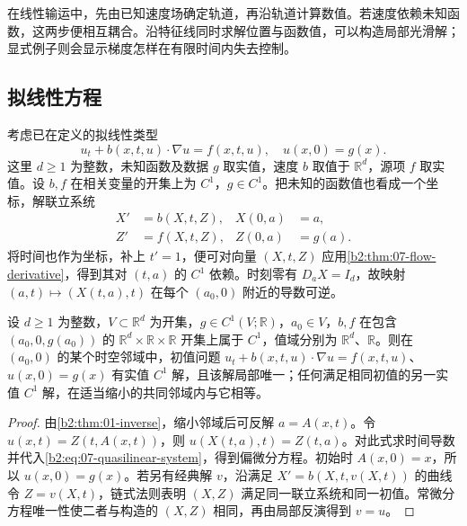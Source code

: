 
在线性输运中，先由已知速度场确定轨道，再沿轨道计算数值。若速度依赖未知函数，这两步便相互耦合。沿特征线同时求解位置与函数值，可以构造局部光滑解；显式例子则会显示梯度怎样在有限时间内失去控制。

\subsection{拟线性方程}
\label{b2:subsec:070401}

考虑已在定义的拟线性类型
\[
 u_t+b(x,t,u)\cdot\nabla u=f(x,t,u),\quad u(x,0)=g(x).
\]
这里 \(d\geq1\) 为整数，未知函数及数据 \(g\) 取实值，速度 \(b\) 取值于 \(\mathbb R^d\)，源项 \(f\) 取实值。设 \(b,f\) 在相关变量的开集上为 \(C^1\)，\(g\in C^1\)。把未知的函数值也看成一个坐标，解联立系统
\begin{equation}\label{b2:eq:07-quasilinear-system}
 \begin{aligned}
 X'&=b(X,t,Z),&X(0,a)&=a,\\
 Z'&=f(X,t,Z),&Z(0,a)&=g(a).
 \end{aligned}
\end{equation}
将时间也作为坐标，补上 \(t'=1\)，便可对向量 \((X,t,Z)\) 应用\cref{b2:thm:07-flow-derivative}，得到其对 \((t,a)\) 的 \(C^1\) 依赖。时刻零有 \(D_aX=I_d\)，故映射 \((a,t)\mapsto(X(t,a),t)\) 在每个 \((a_0,0)\) 附近的导数可逆。

\begin{proposition}\label{b2:prop:07-quasilinear-local}
设 \(d\geq1\) 为整数，\(V\subset\mathbb R^d\) 为开集，\(g\in C^1(V;\mathbb R)\)，\(a_0\in V\)，\(b,f\) 在包含 \((a_0,0,g(a_0))\) 的 \(\mathbb R^d\times\mathbb R\times\mathbb R\) 开集上属于 \(C^1\)，值域分别为 \(\mathbb R^d\)、\(\mathbb R\)。则在 \((a_0,0)\) 的某个时空邻域中，初值问题 \(u_t+b(x,t,u)\cdot\nabla u=f(x,t,u)\)、\(u(x,0)=g(x)\) 有实值 \(C^1\) 解，且该解局部唯一；任何满足相同初值的另一实值 \(C^1\) 解，在适当缩小的共同邻域内与它相等。
\end{proposition}
\begin{proof}
由\cref{b2:thm:01-inverse}，缩小邻域后可反解 \(a=A(x,t)\)。令 \(u(x,t)=Z(t,A(x,t))\)，则
\(u(X(t,a),t)=Z(t,a)\)。对此式求时间导数并代入\eqref{b2:eq:07-quasilinear-system}，得到偏微分方程。初始时 \(A(x,0)=x\)，所以 \(u(x,0)=g(x)\)。若另有经典解 \(v\)，沿满足 \(X'=b(X,t,v(X,t))\) 的曲线令 \(Z=v(X,t)\)，链式法则表明 \((X,Z)\) 满足同一联立系统和同一初值。常微分方程唯一性使二者与构造的 \((X,Z)\) 相同，再由局部反演得到 \(v=u\)。
\end{proof}

